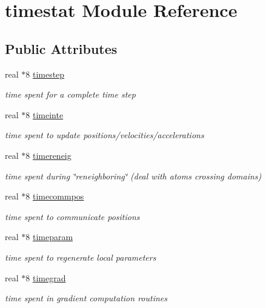 \hypertarget{classtimestat}{\section{timestat Module Reference}
\label{classtimestat}
}
\subsection*{Public Attributes}
\begin{DoxyCompactItemize}
\item 
real $\ast$8 \hyperlink{classtimestat_a4e45aa5368ee73cf0b5e0e181b56cf59}{timestep}
\begin{DoxyCompactList}\small\item\em time spent for a complete time step \end{DoxyCompactList}\item 
real $\ast$8 \hyperlink{classtimestat_a6ee83b4d368fd59cababfaabc46c0e20}{timeinte}
\begin{DoxyCompactList}\small\item\em time spent to update positions/velocities/accelerations \end{DoxyCompactList}\item 
real $\ast$8 \hyperlink{classtimestat_a598e9cddb7b3ec4852e8d74d42f4e06d}{timereneig}
\begin{DoxyCompactList}\small\item\em time spent during \char`\"{}reneighboring\char`\"{} (deal with atoms crossing domains) \end{DoxyCompactList}\item 
real $\ast$8 \hyperlink{classtimestat_adeaa27d83c5a9ed923fd9ad2332e1036}{timecommpos}
\begin{DoxyCompactList}\small\item\em time spent to communicate positions \end{DoxyCompactList}\item 
real $\ast$8 \hyperlink{classtimestat_aad771aed865444d4520ba31e4986427c}{timeparam}
\begin{DoxyCompactList}\small\item\em time spent to regenerate local parameters \end{DoxyCompactList}\item 
real $\ast$8 \hyperlink{classtimestat_a551bee3c78f6e422ca3e7ece6c0418b0}{timegrad}
\begin{DoxyCompactList}\small\item\em time spent in gradient computation routines \end{DoxyCompactList}\item 

\end{DoxyCompactItemize}
